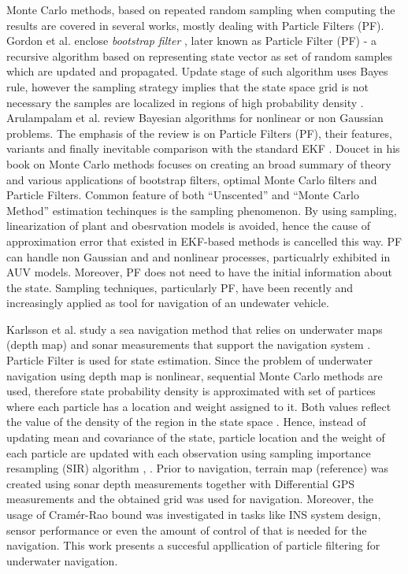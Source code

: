 Monte Carlo methods, based on repeated random sampling when computing the results are covered in several works, mostly dealing with Particle Filters (PF). Gordon et al. enclose \textit{bootstrap filter} \cite{gordon93}, later known as Particle Filter (PF) - a recursive algorithm based on representing state vector as set of random samples which are updated and propagated. Update stage of such algorithm uses Bayes rule, however the sampling strategy implies that the state space grid is not necessary the samples are localized in regions of high probability density \cite{gordon93}. Arulampalam et al. review Bayesian algorithms for nonlinear or non Gaussian problems. The emphasis of the review is on Particle Filters (PF), their features, variants and finally inevitable comparison with the standard EKF \cite{arulampalam02}. Doucet in his book on Monte Carlo methods \cite{doucet01} focuses on creating an broad summary of theory and various applications of bootstrap filters, optimal Monte Carlo filters and Particle Filters. Common feature of both ``Unscented'' and ``Monte Carlo Method'' estimation techinques is the sampling phenomenon. By using sampling, linearization of plant and obesrvation models is avoided, hence the cause of approximation error that existed in EKF-based methods is cancelled this way. PF can handle non Gaussian and and nonlinear processes, particualrly exhibited in AUV models. Moreover, PF does not need to have the initial information about the state. Sampling techniques, particularly PF, have been recently and increasingly applied as tool for navigation of an undewater vehicle.

Karlsson et al. study a sea navigation method that relies on underwater maps (depth map) and sonar measurements that support the navigation system \cite{karlsson02}. Particle Filter is used for state estimation. Since the problem of underwater navigation using depth map is nonlinear, sequential Monte Carlo methods are used, therefore state probability density is approximated with set of partices where each particle has a location and weight assigned to it. Both values reflect the value of the density of the region in the state space \cite{karlsson02}. Hence, instead of updating mean and covariance of the state, particle location and the weight of each particle are updated with each observation using sampling importance resampling (SIR) algorithm \cite{karlsson02}, \cite{gordon93}. Prior to navigation, terrain map (reference) was created using sonar depth measurements together with Differential GPS measurements and the obtained grid was used for navigation. Moreover, the usage of Cram\'{e}r-Rao bound was investigated in tasks like INS system design, sensor performance or even the amount of control of that is needed for the navigation. This work presents a succesful appllication of particle filtering for underwater navigation.

